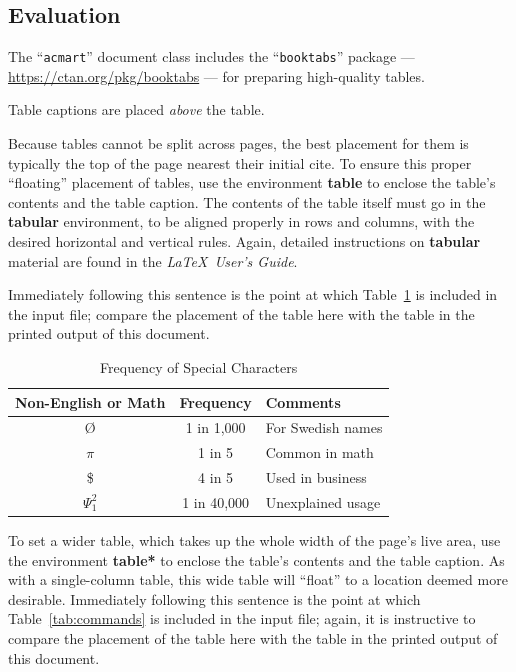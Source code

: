 \documentclass[acmsmall, nonacm]{acmart}
\begin{document}
\begin{enumerate}
\section{Evaluation}

The ``\verb|acmart|'' document class includes the ``\verb|booktabs|''
package --- \url{https://ctan.org/pkg/booktabs} --- for preparing
high-quality tables.

Table captions are placed {\itshape above} the table.

Because tables cannot be split across pages, the best placement for
them is typically the top of the page nearest their initial cite.  To
ensure this proper ``floating'' placement of tables, use the
environment \textbf{table} to enclose the table's contents and the
table caption.  The contents of the table itself must go in the
\textbf{tabular} environment, to be aligned properly in rows and
columns, with the desired horizontal and vertical rules.  Again,
detailed instructions on \textbf{tabular} material are found in the
\textit{\LaTeX\ User's Guide}.

Immediately following this sentence is the point at which
Table~\ref{tab:freq} is included in the input file; compare the
placement of the table here with the table in the printed output of
this document.

\begin{table}
  \caption{Frequency of Special Characters}
  \label{tab:freq}
  \begin{tabular}{ccl}
    \toprule
    Non-English or Math&Frequency&Comments\\
    \midrule
    \O & 1 in 1,000& For Swedish names\\
    $\pi$ & 1 in 5& Common in math\\
    \$ & 4 in 5 & Used in business\\
    $\Psi^2_1$ & 1 in 40,000& Unexplained usage\\
  \bottomrule
\end{tabular}
\end{table}

To set a wider table, which takes up the whole width of the page's
live area, use the environment \textbf{table*} to enclose the table's
contents and the table caption.  As with a single-column table, this
wide table will ``float'' to a location deemed more
desirable. Immediately following this sentence is the point at which
Table~\ref{tab:commands} is included in the input file; again, it is
instructive to compare the placement of the table here with the table
in the printed output of this document.


\end{enumerate}
\end{document}
